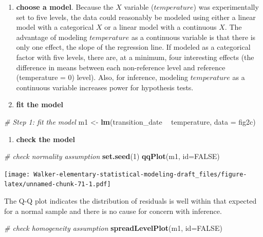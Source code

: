 \documentclass[]{book}
\newenvironment{Shaded}{\begin{snugshade}}{\end{snugshade}}
\newcommand{\CommentTok}[1]{\textcolor[rgb]{0.56,0.35,0.01}{\textit{#1}}}
\newcommand{\DataTypeTok}[1]{\textcolor[rgb]{0.13,0.29,0.53}{#1}}
\newcommand{\DecValTok}[1]{\textcolor[rgb]{0.00,0.00,0.81}{#1}}
\newcommand{\KeywordTok}[1]{\textcolor[rgb]{0.13,0.29,0.53}{\textbf{#1}}}
\newcommand{\NormalTok}[1]{#1}
\newcommand{\OperatorTok}[1]{\textcolor[rgb]{0.81,0.36,0.00}{\textbf{#1}}}
\newcommand{\OtherTok}[1]{\textcolor[rgb]{0.56,0.35,0.01}{#1}}
\newcommand{\StringTok}[1]{\textcolor[rgb]{0.31,0.60,0.02}{#1}}
\providecommand{\tightlist}{%
  \setlength{\itemsep}{0pt}\setlength{\parskip}{0pt}}
\begin{document}
\begin{enumerate}
\def\labelenumi{\arabic{enumi}.}
\setcounter{enumi}{1}
\item
  \textbf{choose a model}. Because the \(X\) variable (\(temperature\)) was experimentally set to five levels, the data could reasonably be modeled using either a linear model with a categorical \(X\) or a linear model with a continuous \(X\). The advantage of modeling \(temperature\) as a continuous variable is that there is only one effect, the slope of the regression line. If modeled as a categorical factor with five levels, there are, at a minimum, four interesting effects (the difference in means between each non-reference level and reference (temperature = 0) level). Also, for inference, modeling \(temperature\) as a continuous variable increases power for hypothesis tests.
\item
  \textbf{fit the model}
\end{enumerate}

\begin{Shaded}
\begin{Highlighting}[]
\CommentTok{# Step 1: fit the model}
\NormalTok{m1 <-}\StringTok{ }\KeywordTok{lm}\NormalTok{(transition_date }\OperatorTok{~}\StringTok{ }\NormalTok{temperature, }\DataTypeTok{data =}\NormalTok{ fig2c)}
\end{Highlighting}
\end{Shaded}

\begin{enumerate}
\def\labelenumi{\arabic{enumi}.}
\setcounter{enumi}{3}
\tightlist
\item
  \textbf{check the model}
\end{enumerate}

\begin{Shaded}
\begin{Highlighting}[]
\CommentTok{# check normality assumption}
\KeywordTok{set.seed}\NormalTok{(}\DecValTok{1}\NormalTok{)}
\KeywordTok{qqPlot}\NormalTok{(m1, }\DataTypeTok{id=}\OtherTok{FALSE}\NormalTok{)}
\end{Highlighting}
\end{Shaded}

\texttt{[image: Walker-elementary-statistical-modeling-draft\_files/figure-latex/unnamed-chunk-71-1.pdf]}

The Q-Q plot indicates the distribution of residuals is well within that expected for a normal sample and there is no cause for concern with inference.

\begin{Shaded}
\begin{Highlighting}[]
\CommentTok{# check homogeneity assumption}
\KeywordTok{spreadLevelPlot}\NormalTok{(m1, }\DataTypeTok{id=}\OtherTok{FALSE}\NormalTok{)}
\end{Highlighting}
\end{Shaded}
\end{document}
